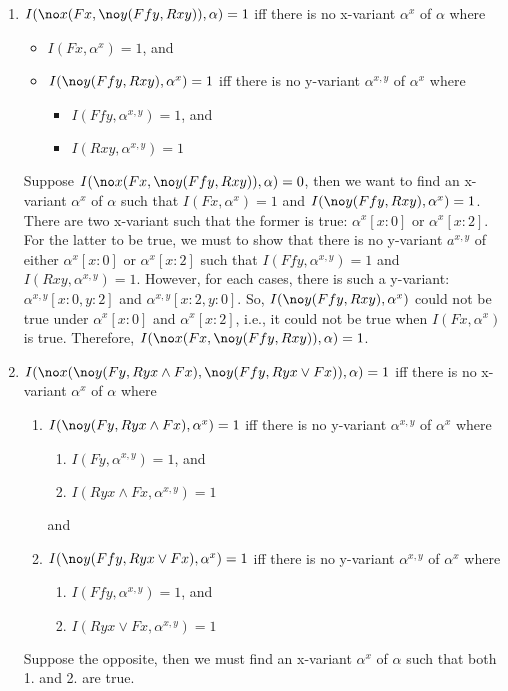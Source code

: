 \begin{enumerate}
\item
$I(\no x (Fx, \no y (Ffy, Rxy)), \alpha) = 1$ iff there is no x-variant $\alpha^x$ of $\alpha$ where
\vspace{-\parskip}
\begin{itemize}[noitemsep, leftmargin=*]
\item $I(Fx, \alpha^x) = 1$, and
\item $I(\no y (Ffy, Rxy), \alpha^x) = 1$ iff there is no y-variant $\alpha^{x,y}$ of $\alpha^x$ where
   \begin{itemize}[topsep=-\parskip, noitemsep, leftmargin=*]
   \item $I(Ffy, \alpha^{x,y}) = 1$, and
   \item $I(Rxy, \alpha^{x,y}) = 1$
   \end{itemize}
\end{itemize}
Suppose $I(\no x (Fx, \no y (Ffy, Rxy)), \alpha) = 0$, then we want to find an x-variant $\alpha^x$ of $\alpha$ such that $I(Fx, \alpha^x) = 1$ and $I(\no y (Ffy, Rxy), \alpha^x) = 1$. There are two x-variant such that the former is true: $\alpha^x[x:0]$ or $\alpha^x[x:2]$. For the latter to be true, we must to show that there is no y-variant $a^{x,y}$ of either $\alpha^x[x:0]$ or $\alpha^x[x:2]$ such that $I(Ffy, \alpha^{x,y}) = 1$ and $I(Rxy, \alpha^{x,y}) = 1$. However, for each cases, there is such a y-variant: $\alpha^{x,y}[x:0,y:2]$ and $\alpha^{x,y}[x:2,y:0]$. So, $I(\no y (Ffy, Rxy), \alpha^x)$ could not be true under $\alpha^x[x:0]$ and $\alpha^x[x:2]$, i.e., it could not be true when $I(Fx, \alpha^x)$ is true. Therefore, $I(\no x (Fx, \no y (Ffy, Rxy)), \alpha) = 1$.

\item
$I(\no x (\no y (Fy, Ryx \land Fx), \no y (Ffy, Ryx \lor Fx)), \alpha) = 1$ iff there is no x-variant $\alpha^x$ of $\alpha$ where
\vspace{-\parskip}
\begin{enumerate}[noitemsep, leftmargin=*, label=\arabic*.]
\item $I(\no y (Fy, Ryx \land Fx), \alpha^x) = 1$ iff there is no y-variant $\alpha^{x,y}$ of $\alpha^x$ where
   \begin{enumerate}[topsep=-\parskip, noitemsep, leftmargin=*, label*=\arabic*.]
   \item $I(Fy, \alpha^{x,y}) = 1$, and
   \item $I(Ryx \land Fx, \alpha^{x,y}) = 1$
   \end{enumerate}
\hspace{-\leftmargin}and
\item $I(\no y (Ffy, Ryx \lor Fx), \alpha^x) = 1$ iff there is no y-variant $\alpha^{x,y}$ of $\alpha^x$ where
   \begin{enumerate}[topsep=-\parskip, noitemsep, leftmargin=*, label*=\arabic*.]
   \item $I(Ffy, \alpha^{x,y}) = 1$, and
   \item $I(Ryx \lor Fx, \alpha^{x,y}) = 1$
   \end{enumerate}
\end{enumerate}
Suppose the opposite, then we must find an x-variant $\alpha^x$ of $\alpha$ such that both 1. and 2. are true.


\end{enumerate}
